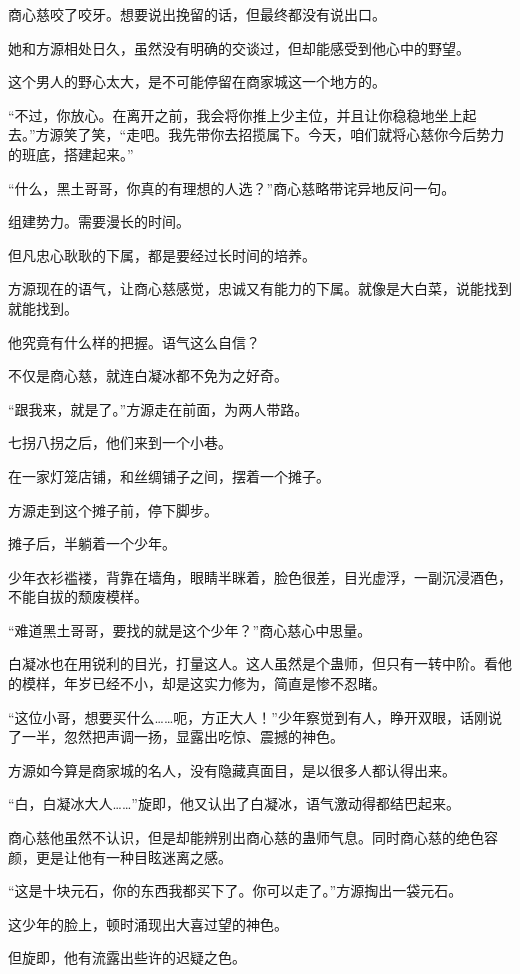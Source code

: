 \begin{this_body}
商心慈咬了咬牙。想要说出挽留的话，但最终都没有说出口。

她和方源相处日久，虽然没有明确的交谈过，但却能感受到他心中的野望。

这个男人的野心太大，是不可能停留在商家城这一个地方的。

“不过，你放心。在离开之前，我会将你推上少主位，并且让你稳稳地坐上起去。”方源笑了笑，“走吧。我先带你去招揽属下。今天，咱们就将心慈你今后势力的班底，搭建起来。”

“什么，黑土哥哥，你真的有理想的人选？”商心慈略带诧异地反问一句。

组建势力。需要漫长的时间。

但凡忠心耿耿的下属，都是要经过长时间的培养。

方源现在的语气，让商心慈感觉，忠诚又有能力的下属。就像是大白菜，说能找到就能找到。

他究竟有什么样的把握。语气这么自信？

不仅是商心慈，就连白凝冰都不免为之好奇。

“跟我来，就是了。”方源走在前面，为两人带路。

七拐八拐之后，他们来到一个小巷。

在一家灯笼店铺，和丝绸铺子之间，摆着一个摊子。

方源走到这个摊子前，停下脚步。

摊子后，半躺着一个少年。

少年衣衫褴褛，背靠在墙角，眼睛半眯着，脸色很差，目光虚浮，一副沉浸酒色，不能自拔的颓废模样。

“难道黑土哥哥，要找的就是这个少年？”商心慈心中思量。

白凝冰也在用锐利的目光，打量这人。这人虽然是个蛊师，但只有一转中阶。看他的模样，年岁已经不小，却是这实力修为，简直是惨不忍睹。

“这位小哥，想要买什么……呃，方正大人！”少年察觉到有人，睁开双眼，话刚说了一半，忽然把声调一扬，显露出吃惊、震撼的神色。

方源如今算是商家城的名人，没有隐藏真面目，是以很多人都认得出来。

“白，白凝冰大人……”旋即，他又认出了白凝冰，语气激动得都结巴起来。

商心慈他虽然不认识，但是却能辨别出商心慈的蛊师气息。同时商心慈的绝色容颜，更是让他有一种目眩迷离之感。

“这是十块元石，你的东西我都买下了。你可以走了。”方源掏出一袋元石。

这少年的脸上，顿时涌现出大喜过望的神色。

但旋即，他有流露出些许的迟疑之色。


\end{this_body}

